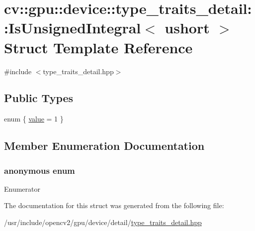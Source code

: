 \hypertarget{structcv_1_1gpu_1_1device_1_1type__traits__detail_1_1IsUnsignedIntegral_3_01ushort_01_4}{\section{cv\-:\-:gpu\-:\-:device\-:\-:type\-\_\-traits\-\_\-detail\-:\-:Is\-Unsigned\-Integral$<$ ushort $>$ Struct Template Reference}
\label{structcv_1_1gpu_1_1device_1_1type__traits__detail_1_1IsUnsignedIntegral_3_01ushort_01_4}
}


{\ttfamily \#include $<$type\-\_\-traits\-\_\-detail.\-hpp$>$}

\subsection*{Public Types}
\begin{DoxyCompactItemize}
\item 
enum \{ \hyperlink{structcv_1_1gpu_1_1device_1_1type__traits__detail_1_1IsUnsignedIntegral_3_01ushort_01_4_ab93b1064ca70981f1123b6b7f99ff2e4ac0f88371a1a25f9239cc8ffb14f4a174}{value} = 1
 \}
\end{DoxyCompactItemize}


\subsection{Member Enumeration Documentation}
\hypertarget{structcv_1_1gpu_1_1device_1_1type__traits__detail_1_1IsUnsignedIntegral_3_01ushort_01_4_ab93b1064ca70981f1123b6b7f99ff2e4}{\subsubsection[{anonymous enum}]{\setlength{\rightskip}{0pt plus 5cm}anonymous enum}}\label{structcv_1_1gpu_1_1device_1_1type__traits__detail_1_1IsUnsignedIntegral_3_01ushort_01_4_ab93b1064ca70981f1123b6b7f99ff2e4}
\begin{Desc}
\item[Enumerator]\par
\begin{description}
\item[{\em 
\hypertarget{structcv_1_1gpu_1_1device_1_1type__traits__detail_1_1IsUnsignedIntegral_3_01ushort_01_4_ab93b1064ca70981f1123b6b7f99ff2e4ac0f88371a1a25f9239cc8ffb14f4a174}{value}\label{structcv_1_1gpu_1_1device_1_1type__traits__detail_1_1IsUnsignedIntegral_3_01ushort_01_4_ab93b1064ca70981f1123b6b7f99ff2e4ac0f88371a1a25f9239cc8ffb14f4a174}
}]\end{description}
\end{Desc}


The documentation for this struct was generated from the following file\-:\begin{DoxyCompactItemize}
\item 
/usr/include/opencv2/gpu/device/detail/\hyperlink{type__traits__detail_8hpp}{type\-\_\-traits\-\_\-detail.\-hpp}\end{DoxyCompactItemize}
